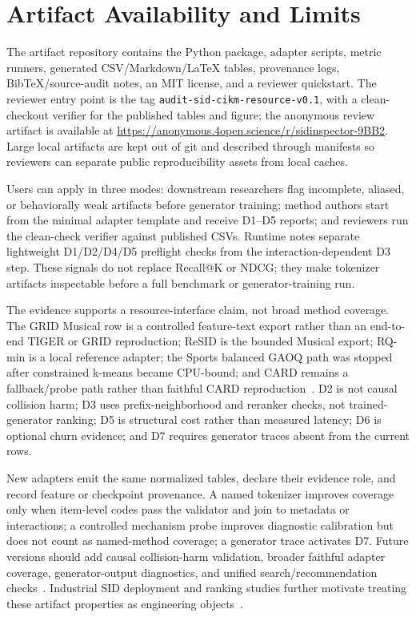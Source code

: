 \section{Artifact Availability and Limits}

The artifact repository contains the \tool Python package, adapter scripts,
metric runners, generated CSV/Markdown/\LaTeX{} tables, provenance logs,
BibTeX/source-audit notes, an MIT license, and a reviewer quickstart. The
reviewer entry point is the tag
\texttt{audit-sid-cikm-resource-v0.1}, with a clean-checkout verifier for the
published tables and figure; the anonymous review artifact is available at
\url{https://anonymous.4open.science/r/sidinspector-9BB2}. Large local artifacts are kept out of git and
described through manifests so reviewers can separate public reproducibility
assets from local caches.

Users can apply \tool in three modes: downstream researchers flag incomplete,
aliased, or behaviorally weak artifacts before generator training; method
authors start from the minimal adapter template and receive D1--D5 reports; and
reviewers run the clean-check verifier against published CSVs. Runtime notes
separate lightweight D1/D2/D4/D5 preflight checks from the interaction-dependent
D3 step. These signals do not replace Recall@K or NDCG; they make tokenizer
artifacts inspectable before a full benchmark or generator-training run.

The evidence supports a resource-interface claim, not broad method coverage.
The GRID Musical row is a controlled feature-text export rather than an
end-to-end TIGER or GRID reproduction; ReSID is the bounded Musical export;
RQ-min is a local reference adapter; the Sports balanced GAOQ path was stopped
after constrained k-means became CPU-bound; and CARD remains a fallback/probe
path rather than faithful CARD reproduction~\cite{wei2026card}. D2 is not
causal collision harm; D3 uses prefix-neighborhood and reranker checks, not
trained-generator ranking; D5 is structural cost rather than measured latency;
D6 is optional churn evidence; and D7 requires generator traces absent from the
current rows.

New adapters emit the same normalized tables, declare their evidence role, and
record feature or checkpoint provenance. A named tokenizer improves coverage
only when item-level codes pass the validator and join to metadata or
interactions; a controlled mechanism probe improves diagnostic calibration but
does not count as named-method coverage; a generator trace activates D7.
Future versions should add causal collision-harm validation, broader faithful
adapter coverage, generator-output diagnostics, and unified search/recommendation
checks~\cite{li2024survey,penha2025jointsid}. Industrial SID deployment and
ranking studies further motivate treating these artifact properties as
engineering objects~\cite{singh2023bettersemanticids,li2026sidcoord,ju2026snapchatsid,xu2026largescalegenrec}.
